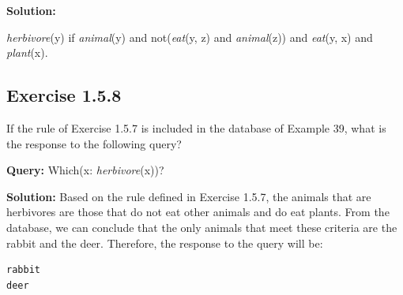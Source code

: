 \documentclass[12pt]{article}
\begin{document}
\textbf{Solution:}

\textit{herbivore}(y) if \textit{animal}(y) and not(\textit{eat}(y, z) and \textit{animal}(z)) and \textit{eat}(y, x) and \textit{plant}(x).

\subsection*{Exercise 1.5.8}

If the rule of Exercise 1.5.7 is included in the database of Example 39, what is the response to the following query?

\textbf{Query:}
Which(x: \textit{herbivore}(x))?


\textbf{Solution:}
Based on the rule defined in Exercise 1.5.7, the animals that are herbivores are those that do not eat other animals and do eat plants. From the database, we can conclude that the only animals that meet these criteria are the rabbit and the deer. Therefore, the response to the query will be:
\begin{lstlisting}
rabbit
deer
\end{lstlisting}
\end{document}
